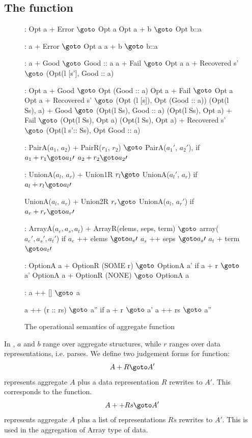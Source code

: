 \subsection{The  function}
\begin{figure}[ht]
\centering
\begin{code}
\cdmath
{}:
  Opt a + Error $\goto$ Opt a
  Opt a + b     $\goto$ Opt b::a

:
  a + Error $\goto$ Opt a
  a + b     $\goto$ b::a

: 
  a + Good $\goto$ Good :: a
  a + Fail $\goto$ Opt a
  a + Recovered s' $\goto$ (Opt(l [s'], Good :: a)

: 
  Opt a + Good $\goto$ Opt (Good :: a)
  Opt a + Fail $\goto$ Opt a
  Opt a + Recovered s' $\goto$ (Opt (l [s]), Opt (Good :: a))
  (Opt(l Ss), a) + Good $\goto$ (Opt(l Ss), Good :: a)
  (Opt(l Ss), Opt a) + Fail $\goto$ (Opt(l Ss), Opt a)
  (Opt(l Ss), Opt a) + Recovered s' $\goto$ (Opt(l s':: Ss), Opt Good :: a)

:
  PairA($a_1$, $a_2$) + PairR($r_1$, $r_2$) $\goto$ PairA($a_1\prime$, $a_2\prime$),
  if 
	$a_1 + r_1 \goto a_1\prime$
	$a_2 + r_2 \goto a_2\prime$


:
  UnionA($a_l$, $a_r$) + Union1R $r_l \goto$ UnionA($a_l\prime$, $a_r$)
  if $a_l + r_l \goto a_l\prime$

  UnionA($a_l$, $a_r$) + Union2R $r_r \goto$ UnionA($a_l$, $a_r\prime$)
  if $a_r + r_r \goto a_r\prime$


:
  ArrayA($a_e, a_s, a_t$) + ArrayR(elems, seps, term) $\goto$ array($a_e\prime, a_s\prime, a_t\prime$)
  if 
	$a_e$ ++ elems $\goto a_e\prime$
	$a_s$ ++ seps  $\goto a_s\prime$
	$a_t$ +  term  $\goto a_t\prime$

:
  OptionA a + OptionR (SOME r) $\goto$ OptionA a' if a + r $\goto$ a'
  OptionA a + OptionR (NONE) $\goto$ OptionA a 

:
  a ++ [] $\goto$ a

  a ++ (r :: rs) $\goto$ a'' 
  if 
	a + r $\goto$ a'
	a ++ rs $\goto$ a''

\end{code}
\caption{The operational semantics of aggregate function}
\label{fig:aggr-sem}
\end{figure}

In , $a$ and $b$ range over aggregate structures, while
$r$ ranges over data representations, i.e. parses.
We define two judgement forms for  function:
\[A + R \goto A'\]
represents aggregate $A$ plus a data representation $R$ rewrites to $A'$.
This corresponds to the  function.
\[A ++ Rs \goto A'\]
represents aggregate $A$ plus a list of representations $Rs$ rewrites
to $A'$. This is used in the aggregation of Array type of data.


